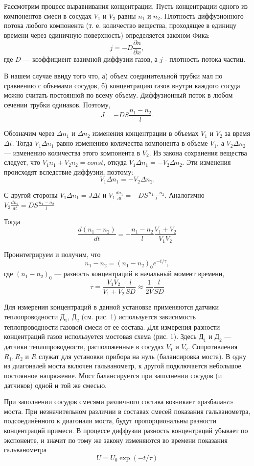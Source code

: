 \documentclass[a4paper,12pt]{article}
\begin{document}
 	
Рассмотрим процесс выравнивания концентрации. Пусть концентрации одного из компонентов смеси в сосудах $V_1$ и $V_2$ равны $n_1$ и
$n_2$. Плотность диффузионного потока любого компонента (т. е. количество вещества, проходящее в единицу времени через единичную поверхность) определяется законом Фика:
$$j=-D\frac{\partial n}{\partial x},$$ где $D$ — коэффициент взаимной диффузии газов, а $j$ - плотность потока частиц.

В нашем случае ввиду того что, а) объем соединительной трубки мал по сравнению с объемами сосудов, б) концентрацию газов внутри каждого сосуда можно считать постоянной по всему объему. Диффузионный поток в любом сечении трубки одинаков. Поэтому, $$J=-DS\frac{n_1-n_2}{l}.$$

Обозначим через $\Delta n_1$ и $\Delta n_2$ изменения концентрации в объемах
$V_1$ и $V_2$ за время $\Delta t$. Тогда $V_1 \Delta n_1$ равно изменению количества компонента в объеме $V_1$, а $V_2 \Delta n_2$ — изменению количества этого компонента в $V_2$. Из закона сохранения вещества следует, что $V_1n_1+V_2n_2 = const$, откуда $V_1 \Delta n_1 = -V_2\Delta n_2.$ Эти изменения происходят вследствие диффузии, поэтому: $$V_1\Delta n_1=-V_2\Delta n_2.$$

С другой стороны $V_1\Delta n_1=J\Delta t$ и $V_1\frac{dn_1}{dt}=-DS\frac{n_1-n_2}{l}.$ Аналогично $V_2\frac{dn_2}{dt}=DS\frac{n_1-n_2}{l}$

Тогда $$\frac{d(n_1-n_2)}{dt}=-\frac{n_1-n_2}{l} \frac{V_1+V_2}{V_1V_2}  $$

Проинтегрируем и получим, что $$n_1-n_2=(n_1-n_2)_0 e^{-t/\tau},$$ где $(n_1-
n_2)_0$ — разность концентраций в начальный момент времени, $$\tau=\frac{V_1V_2}{V_1+V_2}\frac{l}{SD} \approx \frac{1}{2V}\frac{l}{SD}$$

Для измерения концентраций в данной установке применяются датчики теплопроводности $Д_1$, $Д_2$ (см. рис. 1) используется зависимость теплопроводности газовой смеси от ее состава.
Для измерения разности концентраций газов используется мостовая схема (рис. 1). Здесь $Д_1$ и $Д_2$ — датчики теплопроводности, расположенные в сосудах $V_1$ и $V_2$. Сопротивления $R_1, R_2$ и $R$ служат для установки прибора на нуль (балансировка моста). В одну из диагоналей моста включен гальванометр, к другой подключается небольшое постоянное напряжение. Мост балансируется при заполнении сосудов (и датчиков) одной и той же смесью.

При заполнении сосудов смесями различного состава возникает «разбаланc» моста. При незначительном различии в составах смесей показания гальванометра, подсоединённого к диагонали моста, будут пропорциональны разности концентраций примеси. В процессе диффузии
разность концентраций убывает по экспоненте, и значит по тому же закону изменяются во времени показания гальванометра $$U=U_0 \exp(-t/\tau)$$
\end{document}
